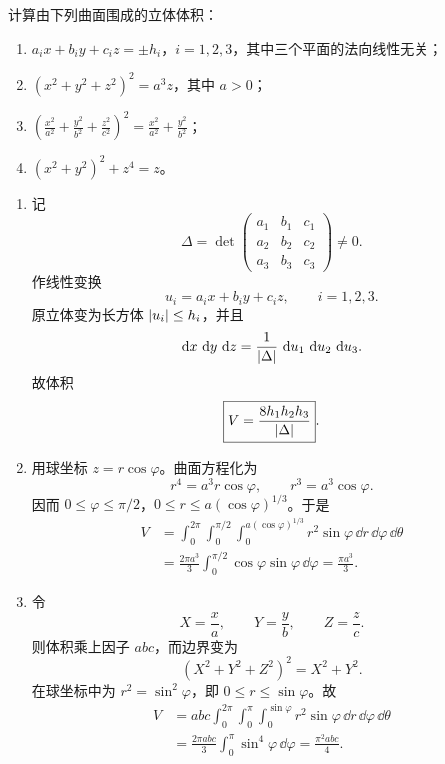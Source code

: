 \begin{xexercise}[1]
计算由下列曲面围成的立体体积：
  \begin{enumerate}[label=(\arabic*)]
    \item $a_ix+b_iy+c_iz=\pm h_i$，$i=1,2,3$，其中三个平面的法向线性无关；
    \item $(x^2+y^2+z^2)^2=a^3z$，其中 $a>0$；
    \item $\displaystyle\left(\frac{x^2}{a^2}+\frac{y^2}{b^2}+\frac{z^2}{c^2}\right)^2=\frac{x^2}{a^2}+\frac{y^2}{b^2}$；
    \item $(x^2+y^2)^2+z^4=z$。
  \end{enumerate}
\end{xexercise}
\begin{xsolution}
\begin{enumerate}[label=(\arabic*)]
  \item 记
  \[
   \Delta=\det
   \begin{pmatrix}
    a_1&b_1&c_1\\
    a_2&b_2&c_2\\
    a_3&b_3&c_3
   \end{pmatrix}\ne0.
  \]
  作线性变换
  \[
   u_i=a_ix+b_iy+c_iz,
   \qquad i=1,2,3.
  \]
  原立体变为长方体 $\lvert u_i\rvert\le h_i$，并且
  \[
   \mathop{}\!\mathrm{d} x\,\mathop{}\!\mathrm{d} y\,\mathop{}\!\mathrm{d} z=\frac1{\lvert\Delta\rvert}\,\mathop{}\!\mathrm{d} u_1\,\mathop{}\!\mathrm{d} u_2\,\mathop{}\!\mathrm{d} u_3.
  \]
  故体积
  \[
   \boxed{V=\frac{8h_1h_2h_3}{\lvert\Delta\rvert}}.
  \]

  \item 用球坐标 $z=r\cos\varphi$。曲面方程化为
  \[
   r^4=a^3r\cos\varphi,
   \qquad r^3=a^3\cos\varphi.
  \]
  因而 $0\le\varphi\le\pi/2$，$0\le r\le a(\cos\varphi)^{1/3}$。于是
  \begin{align*}
   V&=\int_0^{2\pi}\int_0^{\pi/2}\int_0^{a(\cos\varphi)^{1/3}}
   r^2\sin\varphi\,\dd r\,\dd\varphi\,\dd\theta\\
   &=\frac{2\pi a^3}{3}\int_0^{\pi/2}\cos\varphi\sin\varphi\,\dd\varphi
   =\boxed{\frac{\pi a^3}{3}}.
  \end{align*}

  \item 令
  \[
   X=\frac xa,
   \qquad Y=\frac yb,
   \qquad Z=\frac zc.
  \]
  则体积乘上因子 $abc$，而边界变为
  \[
   (X^2+Y^2+Z^2)^2=X^2+Y^2.
  \]
  在球坐标中为 $r^2=\sin^2\varphi$，即 $0\le r\le\sin\varphi$。故
  \begin{align*}
   V&=abc\int_0^{2\pi}\int_0^\pi\int_0^{\sin\varphi}
   r^2\sin\varphi\,\dd r\,\dd\varphi\,\dd\theta\\
   &=\frac{2\pi abc}{3}\int_0^\pi\sin^4\varphi\,\dd\varphi
   =\boxed{\frac{\pi^2abc}{4}}.
  \end{align*}


\end{enumerate}
\end{xsolution}
